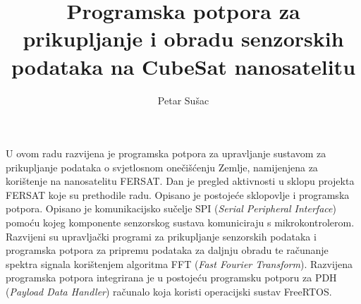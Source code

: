 \documentclass[times, utf8, zavrsni, numeric]{fer}
\begin{document}

\title{Programska potpora za prikupljanje i obradu senzorskih podataka na CubeSat nanosatelitu}

\author{Petar Sušac}


%


\tableofcontents











\begin{sazetak}
U ovom radu razvijena je programska potpora za upravljanje sustavom za prikupljanje podataka o svjetlosnom onečišćenju Zemlje, namijenjena za korištenje na nanosatelitu FERSAT. Dan je pregled aktivnosti u sklopu projekta FERSAT koje su prethodile radu. Opisano je postojeće sklopovlje i programska potpora. Opisano je komunikacijsko sučelje SPI (\textit{Serial Peripheral Interface}) pomoću kojeg komponente senzorskog sustava komuniciraju s mikrokontrolerom. Razvijeni su upravljački programi za prikupljanje senzorskih podataka i programska potpora za pripremu podataka za daljnju obradu te računanje spektra signala korištenjem algoritma FFT (\textit{Fast Fourier Transform}). Razvijena programska potpora integrirana je u postojeću programsku potporu za PDH (\textit{Payload Data Handler}) računalo koja koristi operacijski sustav FreeRTOS.

\end{sazetak}
\end{document}
